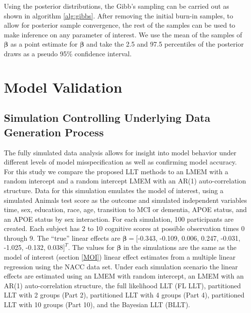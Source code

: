 \documentclass[
]{article}
\begin{document}
Using the posterior distributions, the Gibb's sampling can be carried out as shown in algorithm \ref{alg:gibbs}. After removing the initial burn-in samples, to allow for posterior sample convergence, the rest of the samples can be used to make inference on any parameter of interest. We use the mean of the samples of \(\boldsymbol{\beta}\) as a point estimate for \(\boldsymbol{\beta}\) and take the 2.5 and 97.5 percentiles of the posterior draws as a pseudo 95\% confidence interval.

\hypertarget{model-validation}{%
\section{Model Validation}\label{model-validation}}

\hypertarget{simulation-controlling-underlying-data-generation-process}{%
\subsection{Simulation Controlling Underlying Data Generation Process}\label{simulation-controlling-underlying-data-generation-process}}

The fully simulated data analysis allows for insight into model behavior under different levels of model misspecification as well as confirming model accuracy. For this study we compare the proposed LLT methods to an LMEM with a random intercept and a random intercept LMEM with an AR(1) auto-correlation structure. Data for this simulation emulates the model of interest, using a simulated Animals test score as the outcome and simulated independent variables time, sex, education, race, age, transition to MCI or dementia, APOE status, and an APOE status by sex interaction. For each simulation, 100 participants are created. Each subject has 2 to 10 cognitive scores at possible observation times 0 through 9. The ``true'' linear effects are \(\boldsymbol{\beta} = [\)-0.343, -0.109, 0.006, 0.247, -0.031, -1.025, -0.132, 0.038\(]^T\). The values for \(\boldsymbol{\beta}\) in the simulations are the same as the model of interest (section \ref{MOI}) linear effect estimates from a multiple linear regression using the NACC data set. Under each simulation scenario the linear effects are estimated using an LMEM with random intercept, an LMEM with an AR(1) auto-correlation structure, the full likelihood LLT (FL LLT), partitioned LLT with 2 groups (Part 2), partitioned LLT with 4 groups (Part 4), partitioned LLT with 10 groups (Part 10), and the Bayesian LLT (BLLT).
\end{document}
